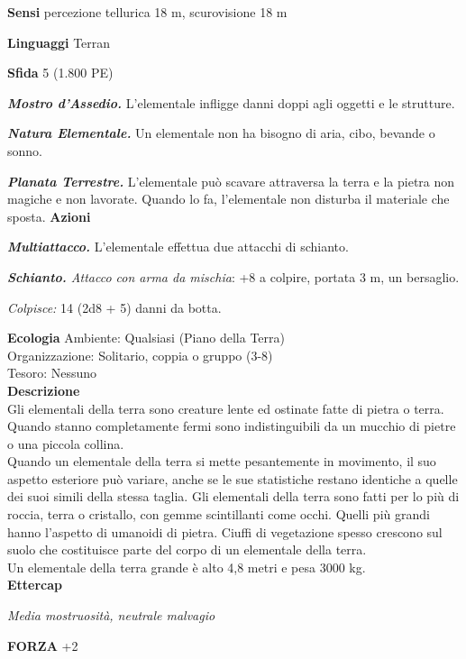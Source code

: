 \begin{multicols}{2}
\textbf{Sensi} percezione tellurica 18 m, scurovisione 18 m

\textbf{Linguaggi} Terran

\textbf{Sfida} 5 (1.800 PE)

\emph{\textbf{Mostro d'Assedio.}} L'elementale infligge danni doppi agli oggetti e le strutture.

\emph{\textbf{Natura Elementale.}} Un elementale non ha bisogno di aria, cibo, bevande o sonno.

\emph{\textbf{Planata Terrestre.}} L'elementale può scavare attraversa la terra e la pietra non magiche e non lavorate. Quando lo fa, l'elementale non disturba il materiale che sposta. 
\textbf{Azioni}

\emph{\textbf{Multiattacco.}} L'elementale effettua due attacchi di schianto.

\emph{\textbf{Schianto.} Attacco con arma da mischia}: +8 a colpire, portata 3 m, un bersaglio.

\emph{Colpisce:} 14 (2d8 + 5) danni da botta.

\textbf{Ecologia}
Ambiente: Qualsiasi (Piano della Terra)\\
Organizzazione: Solitario, coppia o gruppo (3-8)\\
Tesoro: Nessuno\\
\textbf{Descrizione}\\
Gli elementali della terra sono creature lente ed ostinate fatte di pietra o terra. Quando stanno completamente fermi sono indistinguibili da un mucchio di pietre o una piccola collina.\\

Quando un elementale della terra si mette pesantemente in movimento, il suo aspetto esteriore può variare, anche se le sue statistiche restano identiche a quelle dei suoi simili della stessa taglia. Gli elementali della terra sono fatti per lo più di roccia, terra o cristallo, con gemme scintillanti come occhi. Quelli più grandi hanno l'aspetto di umanoidi di pietra. Ciuffi di vegetazione spesso crescono sul suolo che costituisce parte del corpo di un elementale della terra.\\

Un elementale della terra grande è alto 4,8 metri e pesa 3000 kg.\\


\medskip{}\textbf{Ettercap}

\emph{Media mostruosità, neutrale malvagio}

\textbf{FORZA} +2


\end{multicols}
